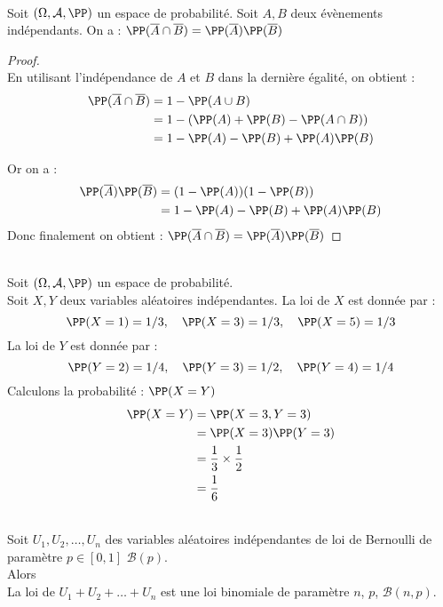 \documentclass[12pt,fleqn]{report} %
\begin{document}
\begin{example}
	\begin{proposition}\text{ }\\
		Soit $(\Omega,\mathcal{A},\PP)$ un espace de probabilité.	Soit $A,B$ deux évènements indépendants. On a : $ \PP(\overline{A} \cap \overline{B}) = \PP(\overline{A})\PP(\overline{B}) $
	\end{proposition}
	\begin{proof}\text{ }\\
		En utilisant l'indépendance de $A$ et $B$ dans la dernière égalité, on obtient : \begin{align*}
		\PP(\overline{A}\cap \overline{B}) & = 1 - \PP(A \cup B) \\ 
		&= 1 - (\PP(A) + \PP(B) - \PP(A \cap B)) \\
		&= 1 - \PP(A) - \PP(B) + \PP(A)\PP(B)
		\end{align*}
		
		Or on a :\begin{align*}
		\PP(\overline{A})\PP(\overline{B}) & = (1 - \PP(A))(1 - \PP(B)) \\
		& = 1 -\PP(A) - \PP(B) + \PP(A)\PP(B)
		\end{align*}
		Donc finalement on obtient : $	\PP(\overline{A}\cap \overline{B}) = \PP(\overline{A})\PP(\overline{B})$
	\end{proof}
	
	\begin{example}\text{ }\\
		Soit $(\Omega,\mathcal{A},\PP)$ un espace de probabilité.\\ Soit $X,Y$ deux variables aléatoires indépendantes.
		La loi de $X$ est donnée par :\[
		\PP(X = 1) = 1/3,\quad \PP(X = 3) = 1/3, \quad \PP(X = 5) = 1/3
		\]
		La loi de $Y$ est donnée par : \[
		\PP(Y = 2) = 1/4, \quad \PP(Y = 3) = 1/2, \quad \PP(Y = 4) = 1/4  
		\]
		Calculons la probabilité : $\PP(X = Y)$ 
		\begin{align*}
		\PP(X = Y) & = \PP(X = 3, Y = 3) \\ 
		& = \PP(X = 3)\PP(Y = 3) \\
		& = \frac{1}{3}\times \frac{1}{2}\\
		& = \frac{1}{6}
		\end{align*}
		
		
	\end{example}
	
	
	\begin{proposition}\label{Proposition Caract Loi Binom}\text{ }\\
		Soit $U_1,U_2,\dots,U_n$ des variables aléatoires indépendantes de loi de Bernoulli de paramètre $p \in [0,1]$ $\mathcal{B}(p)$.\\
		Alors \\
		La loi de $U_1 + U_2 + \dots + U_n$ est une loi binomiale de paramètre $n$, $p$, $\mathcal{B}(n,p)$.
	\end{proposition}
	

\end{example}
\end{document}
